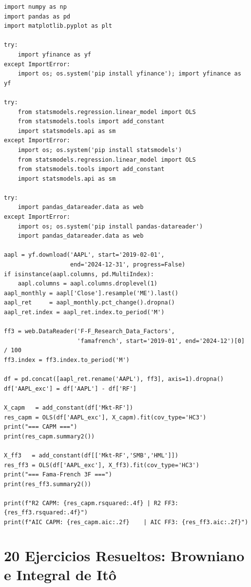 \documentclass[12pt,letterpaper]{article}
\begin{document}
\begin{lstlisting}[style=python, caption={Proyecto Final -- CAPM y FF3 para AAPL}]
import numpy as np
import pandas as pd
import matplotlib.pyplot as plt

try:
    import yfinance as yf
except ImportError:
    import os; os.system('pip install yfinance'); import yfinance as yf

try:
    from statsmodels.regression.linear_model import OLS
    from statsmodels.tools import add_constant
    import statsmodels.api as sm
except ImportError:
    import os; os.system('pip install statsmodels')
    from statsmodels.regression.linear_model import OLS
    from statsmodels.tools import add_constant
    import statsmodels.api as sm

try:
    import pandas_datareader.data as web
except ImportError:
    import os; os.system('pip install pandas-datareader')
    import pandas_datareader.data as web

aapl = yf.download('AAPL', start='2019-02-01',
                   end='2024-12-31', progress=False)
if isinstance(aapl.columns, pd.MultiIndex):
    aapl.columns = aapl.columns.droplevel(1)
aapl_monthly = aapl['Close'].resample('ME').last()
aapl_ret     = aapl_monthly.pct_change().dropna()
aapl_ret.index = aapl_ret.index.to_period('M')

ff3 = web.DataReader('F-F_Research_Data_Factors',
                     'famafrench', start='2019-01', end='2024-12')[0] / 100
ff3.index = ff3.index.to_period('M')

df = pd.concat([aapl_ret.rename('AAPL'), ff3], axis=1).dropna()
df['AAPL_exc'] = df['AAPL'] - df['RF']

X_capm   = add_constant(df['Mkt-RF'])
res_capm = OLS(df['AAPL_exc'], X_capm).fit(cov_type='HC3')
print("=== CAPM ===")
print(res_capm.summary2())

X_ff3   = add_constant(df[['Mkt-RF','SMB','HML']])
res_ff3 = OLS(df['AAPL_exc'], X_ff3).fit(cov_type='HC3')
print("=== Fama-French 3F ===")
print(res_ff3.summary2())

print(f"R2 CAPM: {res_capm.rsquared:.4f} | R2 FF3: {res_ff3.rsquared:.4f}")
print(f"AIC CAPM: {res_capm.aic:.2f}    | AIC FF3: {res_ff3.aic:.2f}")
\end{lstlisting}

\part{20 Ejercicios Resueltos: Browniano e Integral de It\^o}
\end{document}
